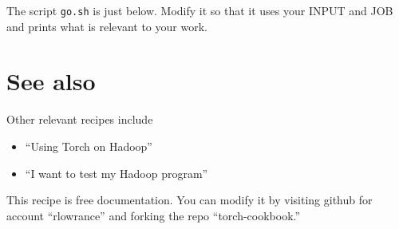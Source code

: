 \documentclass{article}
\let\code\texttt %
\begin{document}


The script \code{go.sh} is just below. Modify it so that it uses your
INPUT and JOB and prints what is relevant to your work.






\section{See also}

Other relevant recipes include
\begin{itemize}
  \item ``Using Torch on Hadoop''
  \item ``I want to test my Hadoop program''
\end{itemize}

This recipe is free documentation. You can modify it by visiting
github for account ``rlowrance'' and forking the repo
``torch-cookbook.''
\end{document}
